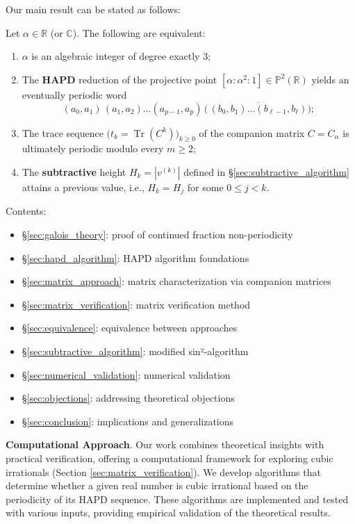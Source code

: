 Our main result can be stated as follows:

\begin{theorem}\label{thm:main}
Let $\alpha\in\mathbb{R}$ (or $\mathbb{C}$). The following are equivalent:
\begin{enumerate}
    \item $\alpha$ is an algebraic integer of degree exactly $3$;
    \item The \textbf{HAPD} reduction of the projective point $[\alpha:\alpha^{2}:1]\in\mathbb{P}^{2}(\mathbb{R})$ yields an eventually periodic word
    \[
    (a_{0},a_{1})\,(a_{1},a_{2})\ldots(a_{p-1},a_{p})\,\bigl(\,\overline{(b_{0},b_{1})\ldots(b_{\ell-1},b_{\ell})}\bigr);
    \]
    \item The trace sequence $\bigl(t_{k}=\operatorname{Tr}(C^{k})\bigr)_{k\ge0}$ of the companion matrix $C=C_{\alpha}$ is ultimately periodic modulo every $m\ge2$;
    \item The \textbf{subtractive} height $H_{k}=|v^{(k)}|$ defined in \S\ref{sec:subtractive_algorithm} attains a previous value, i.e., $H_{k}=H_{j}$ for some $0\le j<k$.
\end{enumerate}
\end{theorem}

Contents:
\begin{itemize}
\item \S\ref{sec:galois_theory}: proof of continued fraction non-periodicity
\item \S\ref{sec:hapd_algorithm}: HAPD algorithm foundations
\item \S\ref{sec:matrix_approach}: matrix characterization via companion matrices
\item \S\ref{sec:matrix_verification}: matrix verification method
\item \S\ref{sec:equivalence}: equivalence between approaches
\item \S\ref{sec:subtractive_algorithm}: modified sin²-algorithm
\item \S\ref{sec:numerical_validation}: numerical validation
\item \S\ref{sec:objections}: addressing theoretical objections
\item \S\ref{sec:conclusion}: implications and generalizations
\end{itemize}

\textbf{Computational Approach}. Our work combines theoretical insights with practical verification, offering a computational framework for exploring cubic irrationals (Section \ref{sec:matrix_verification}). We develop algorithms that determine whether a given real number is cubic irrational based on the periodicity of its HAPD sequence. These algorithms are implemented and tested with various inputs, providing empirical validation of the theoretical results.
